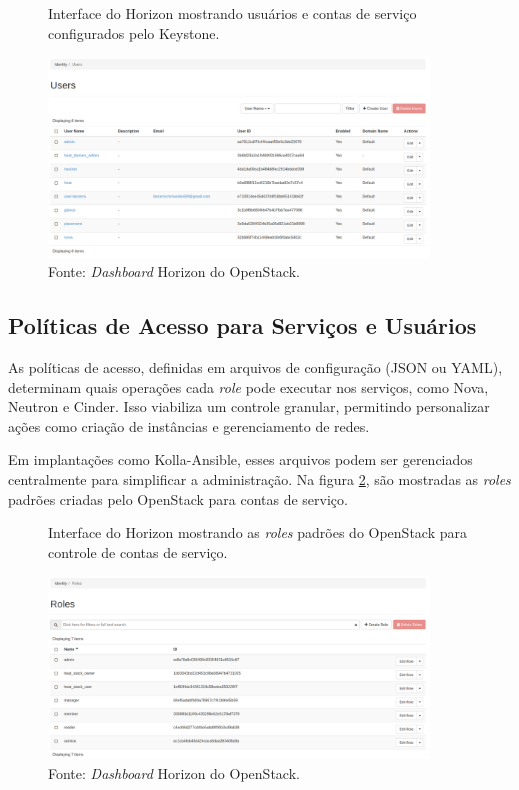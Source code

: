 \begin{figure}[htbp]
    \centering
    \caption{Interface do Horizon mostrando usuários e contas de serviço configurados pelo Keystone.}
    \includegraphics[width=0.9\textwidth]{images/openstack_users.png}
    \caption*{Fonte: \textit{Dashboard} Horizon do OpenStack.}
    \label{fig:openstack_users}
\end{figure}

\subsection{Políticas de Acesso para Serviços e Usuários}
As políticas de acesso, definidas em arquivos de configuração (JSON ou YAML), determinam quais operações cada \textit{role} pode executar nos serviços, como Nova, Neutron e Cinder. Isso viabiliza um controle granular, permitindo personalizar ações como criação de instâncias e gerenciamento de redes.

Em implantações como Kolla-Ansible, esses arquivos podem ser gerenciados centralmente para simplificar a administração. Na figura \ref{fig:openstack_roles}, são mostradas as \textit{roles} padrões criadas pelo OpenStack para contas de serviço.

\begin{figure}[htbp]
    \centering
    \caption{Interface do Horizon mostrando as \textit{roles} padrões do OpenStack para controle de contas de serviço.}
    \includegraphics[width=0.9\textwidth]{images/openstack_roles.png}
    \caption*{Fonte: \textit{Dashboard} Horizon do OpenStack.}
    \label{fig:openstack_roles}
\end{figure}

